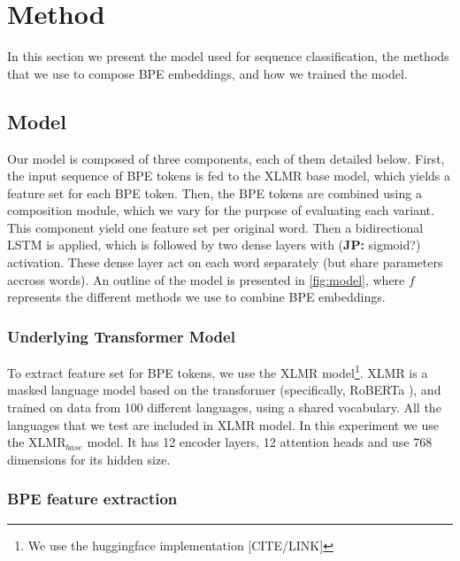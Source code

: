 \documentclass[11pt]{article}
\newcommand\jp[1]{(\textbf{JP:} #1)}
\begin{document}
	\section{Method}
	\label{method}
	In this section we present the model used for sequence
        classification, the methods that we use to compose BPE
        embeddings, and how we trained the model.

	\subsection{Model}

        Our model is composed of three components, each of them
        detailed below. First, the input sequence of BPE tokens is fed
        to the XLMR base model, which yields a feature set for each
        BPE token. Then, the BPE tokens are combined using a
        composition module, which we vary for the purpose of
        evaluating each variant. This component yield one feature set
        per original word. Then a bidirectional LSTM is applied, which
        is followed by two dense layers with \jp{sigmoid?}
        activation. These dense layer act on each word separately (but
        share parameters accross words).  An outline of the model is
        presented in \cref{fig:model}, where $f$ represents the
        different methods we use to combine BPE embeddings.

	\subsubsection{Underlying Transformer Model}
        	To extract feature set for BPE tokens, we use the XLMR
     \cite{conneau2019unsupervised} model\footnote{We use the
     huggingface implementation [CITE/LINK]}. XLMR is a masked
     language model based on the transformer (specifically, RoBERTa
     \cite{liu2019roberta}), and trained on data from 100 different
     languages, using a shared vocabulary. All the languages that we test are
     included in XLMR model. In this experiment we use the
     \textsc{XLMR}$_{base}$ model. It has 12 encoder layers, 12
      attention heads and use 768 dimensions for its hidden size.
	
	\subsubsection{BPE feature extraction}
        \label{sec:bpe-features}

\end{document}
